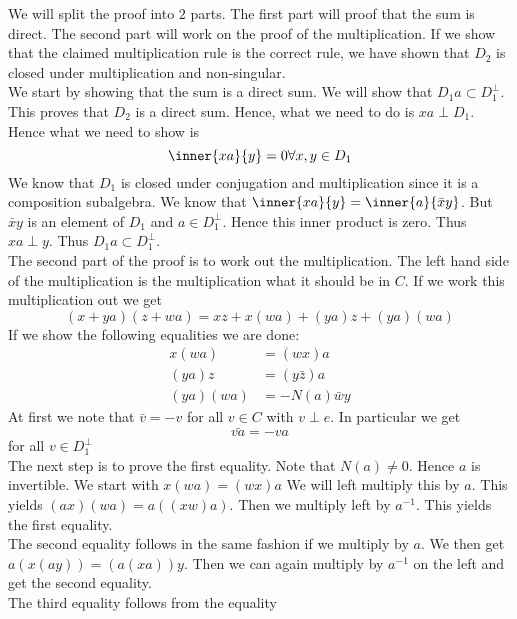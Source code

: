 \documentclass[../Thesis.tex]{subfiles}
\begin{document}
\begin{myproof}
We will split the proof into $2$ parts. The first part will proof that the sum is direct. The second part will work on the proof of the multiplication. If we show that the claimed multiplication rule is the correct rule, we have shown that $D_2$ is closed under multiplication and non-singular.
\\We start by showing that the sum is a direct sum. We will show that $D_1a \subset D_1^\perp$. This proves that $D_2$ is a direct sum. Hence, what we need to do is $xa \perp D_1$. Hence what we need to show is
\begin{equation}
\inner{xa}{y} = 0 \forall x, y \in D_1
\end{equation}
We know that $D_1$ is closed under conjugation and multiplication since it is a composition subalgebra. We know that $\inner{xa}{y} = \inner{a}{\bar{x}y}$. But $\bar{x}y$ is an element of $D_1$ and $a \in D_1^\perp$. Hence this inner product is zero. Thus $xa \perp y$. Thus $D_1a \subset D_1^\perp$.
\\The second part of the proof is to work out the multiplication. The left hand side of the multiplication is the multiplication what it should be in $C$. If we work this multiplication out we get
\begin{equation}
(x + ya)(z + wa) = xz + x(wa) + (ya)z + (ya)(wa)
\end{equation}
If we show the following equalities we are done:
\begin{align}
x(wa) &= (wx)a\\
(ya)z &= (y \bar{z})a \\
(ya)(wa) &= -N(a)\bar{w}y
\end{align}
At first we note that $\bar{v} = -v$ for all $v \in C$ with $v \perp e$. In particular we get
\begin{equation}
\bar{va} = -va
\end{equation}
for all $v \in D_1^\perp$
\\The next step is to prove the first equality. Note that $N(a) \neq 0$. Hence $a$ is invertible. We start with $x(wa) = (wx)a$ We will left multiply this by $a$. This yields $(ax)(wa) = a((xw)a)$. Then we multiply left by $a^{-1}$. This yields the first equality.
\\The second equality follows in the same fashion if we multiply by $a$. We then get $a(x(ay)) = (a(xa))y$. Then we can again multiply by $a^{-1}$ on the left and get the second equality.
\\The third equality follows from the equality

\end{myproof}
\end{document}
